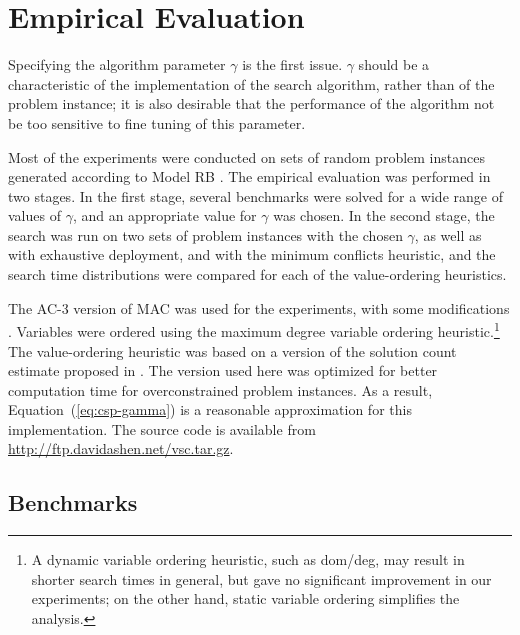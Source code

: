 \section{Empirical Evaluation}
\label{sec:csp-empirical}

Specifying the algorithm parameter $\gamma$ is the first issue.
$\gamma$ should be a characteristic of the
implementation of the search algorithm, rather than of the problem
instance; it is also desirable that the performance of the algorithm not
be too sensitive to fine tuning of this parameter.


Most of the  experiments were conducted on sets of random problem instances
generated according to Model RB \cite{Xu.rb}. The empirical evaluation
was performed in two stages. In the first stage, several benchmarks
were solved for a wide range of values of $\gamma$, and an appropriate
value for $\gamma$ was chosen. In the second stage, the search was run
on two sets of problem instances with the chosen $\gamma$, as well as
with exhaustive deployment, and with the minimum conflicts
heuristic, and the search time distributions were compared for each of
the value-ordering heuristics.

The AC-3 version of MAC was used for the experiments, with some
modifications \cite{Sabin.mac}. Variables were ordered using the
maximum degree variable ordering heuristic.\footnote{A dynamic
  variable ordering heuristic, such as dom/deg, may result in shorter
  search times in general, but gave no significant improvement in our
  experiments; on the other hand, static variable ordering simplifies
  the analysis.} The value-ordering heuristic was based on a version
of the solution count estimate proposed in \cite{Meisels.solcount}.
The version used here was optimized for better computation time for
overconstrained problem instances. As a result,
Equation~(\ref{eq:csp-gamma}) is a reasonable approximation for this
implementation. The source code is available from
\url{http://ftp.davidashen.net/vsc.tar.gz}.

\subsection{Benchmarks}

